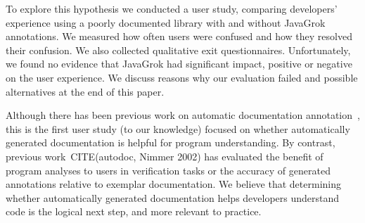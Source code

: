 To explore this hypothesis we conducted a user study, comparing developers'
experience using a poorly documented library with and without JavaGrok
annotations.  We measured how often users were confused and how they resolved their confusion.  We also collected qualitative exit
questionnaires.  Unfortunately, we found no evidence that JavaGrok had significant impact, positive or negative on the user experience.  We discuss reasons why our evaluation failed and possible alternatives at the end of this paper.

Although there has been previous work on automatic
documentation annotation~\cite{autodoc}, this is the first user study (to our knowledge)
focused on whether automatically generated documentation is helpful for program understanding.  By contrast, previous work~CITE(autodoc, Nimmer 2002) has evaluated the benefit of program analyses to users in verification tasks or the accuracy of generated annotations relative to exemplar documentation.
We believe that determining whether automatically generated documentation helps
developers understand code is the logical next step, and more relevant to practice.


